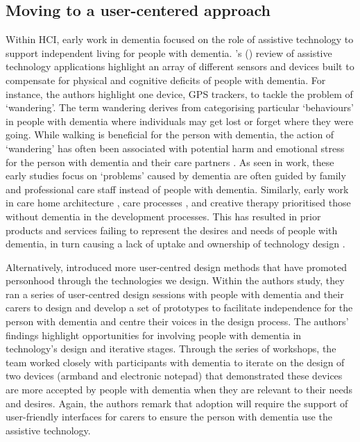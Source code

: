 \subsection{Moving to a user-centered approach}
\label{BL:Tech}
Within HCI, early work in dementia focused on the role of assistive technology to support independent living for people with dementia. \citeauthor{bharucha2009intelligent}'s (\citeyear{bharucha2009intelligent}) review of assistive technology applications highlight an array of different sensors and devices built to compensate for physical and cognitive deficits of people with dementia. For instance, the authors highlight one device, GPS trackers, to tackle the problem of `wandering'. The term wandering derives from categorising particular `behaviours' in people with dementia where individuals may get lost or forget where they were going. While walking is beneficial for the person with dementia, the action of `wandering' has often been associated with potential harm and emotional stress for the person with dementia and their care partners \citep{robinson2007balancing}. As seen in \cite{bharucha2009intelligent} work, these early studies focus on `problems' caused by dementia are often guided by family and professional care staff instead of people with dementia. Similarly, early work in care home architecture \citep{torrington2006has}, care processes \citep{rabins2006practical}, and creative therapy \citep{schmitt2006creative} prioritised those without dementia in the development processes. This has resulted in prior products and services failing to represent the desires and needs of people with dementia, in turn causing a lack of uptake and ownership of technology design \citep{gibson2019personalisation}. 

Alternatively, \cite{robinson2009keeping} introduced more user-centred design methods that have promoted personhood through the technologies we design. Within the authors study, they ran a series of user-centred design sessions with people with dementia and their carers to design and develop a set of prototypes to facilitate independence for the person with dementia and centre their voices in the design process. The authors' findings highlight opportunities for involving people with dementia in technology's design and iterative stages. Through the series of workshops, the team worked closely with participants with dementia to iterate on the design of two devices (armband and electronic notepad) that demonstrated these devices are more accepted by people with dementia when they are relevant to their needs and desires. Again, the authors  remark that adoption will require the support of user-friendly interfaces for carers to ensure the person with dementia use the assistive technology. 

